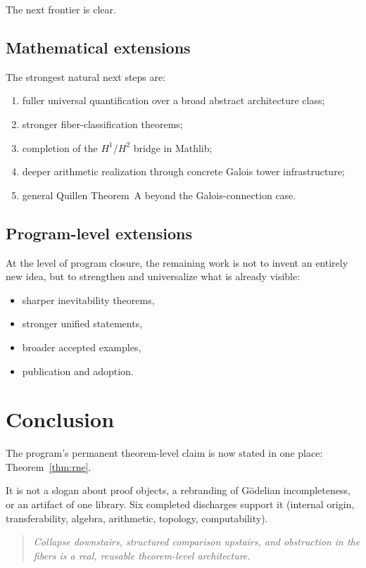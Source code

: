 \documentclass[11pt]{article}
\begin{document}
The next frontier is clear.

\subsection{Mathematical extensions}

The strongest natural next steps are:
\begin{enumerate}[label=(\arabic*)]
  \item fuller universal quantification over a broad abstract architecture class;
  \item stronger fiber-classification theorems;
  \item completion of the $H^1/H^2$ bridge in Mathlib;
  \item deeper arithmetic realization through concrete Galois tower infrastructure;
  \item general Quillen Theorem~A beyond the Galois-connection case.
\end{enumerate}

\subsection{Program-level extensions}

At the level of program closure, the remaining work is not to invent an entirely
new idea, but to strengthen and universalize what is already visible:
\begin{itemize}
  \item sharper inevitability theorems,
  \item stronger unified statements,
  \item broader accepted examples,
  \item publication and adoption.
\end{itemize}

\section{Conclusion}\label{sec:conclusion}

The program's permanent theorem-level claim is now stated in one place:
Theorem~\ref{thm:rne}.

It is not a slogan about proof objects, a rebranding of G\"odelian incompleteness,
or an artifact of one library. Six completed discharges support it (internal origin,
transferability, algebra, arithmetic, topology, computability).

\begin{quote}
\emph{Collapse downstairs, structured comparison upstairs, and obstruction in the
fibers is a real, reusable theorem-level architecture.}
\end{quote}
\end{document}
